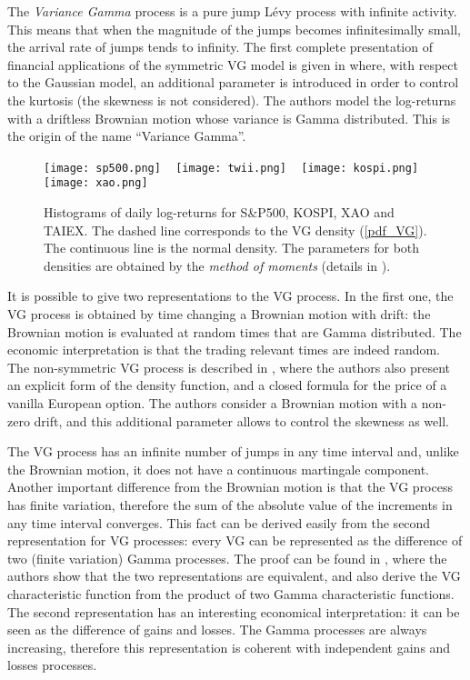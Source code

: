 \documentclass[]{interact}
\theoremstyle{plain}%
\theoremstyle{definition}
\theoremstyle{remark}
\begin{document}
The \emph{Variance Gamma} process is a pure jump Lévy process with infinite activity.
This means that when the magnitude of the jumps becomes infinitesimally small, the arrival rate of jumps tends to infinity.
The first complete presentation of financial applications of the symmetric VG model is given in \cite{MaSe90} 
where, with respect to the Gaussian model, an additional parameter is introduced in order to control the kurtosis 
(the skewness is not considered).
The authors model the log-returns with a driftless Brownian motion whose variance is Gamma distributed. 
This is the origin of the name ``Variance Gamma''.
\begin{figure}[t!]
 \centering
 \texttt{[image: sp500.png]}
 ~
 \texttt{[image: twii.png]}
 ~
 \texttt{[image: kospi.png]}
 ~
 \texttt{[image: xao.png]}
 \caption{Histograms of daily log-returns for S\&P500, KOSPI, XAO and TAIEX. The dashed line corresponds to the VG density (\ref{pdf_VG}). 
 The continuous line is the normal density. The parameters for both densities are obtained by the \emph{method of moments} (details in \cite{Se04}).}
 \label{FigPDF}
\end{figure} 

It is possible to give two representations to the VG process. In the first one,
the VG process is obtained by time changing a Brownian motion with drift:
the Brownian motion is evaluated at random times that are Gamma distributed.
The economic interpretation is that the trading relevant times are indeed random. 
The non-symmetric VG process is described in \cite{MCC98}, 
where the authors also present an explicit form of the density function, 
and a closed formula for the price of a vanilla European option.
The authors consider a Brownian motion with a non-zero drift, and this additional parameter allows to control the skewness as well.

The VG process 
has an infinite number of jumps in any time interval and, unlike the Brownian motion, it does not have a continuous martingale component.
Another important difference from the Brownian motion is that the VG process has finite variation, therefore the sum of the
absolute value of the increments in any time interval converges.
This fact can be derived easily from the second representation for VG processes: every VG can be represented as the difference of two 
(finite variation) Gamma processes.
The proof can be found in \cite{MCC98}, where the authors show that the two representations are equivalent, 
and also derive the VG characteristic function from the product
of two Gamma characteristic functions. 
The second representation has an interesting economical interpretation:
it can be seen as the difference of gains and losses. The Gamma
processes are always increasing, therefore this representation is coherent with independent gains and losses processes.
\end{document}
